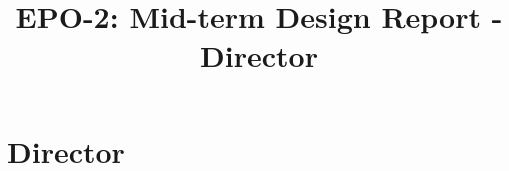 \documentclass{report}
\title{EPO-2: Mid-term Design Report - Director}
\author{}
\begin{document}
\chapter{Director}
\label{ch:director}
\end{document}
